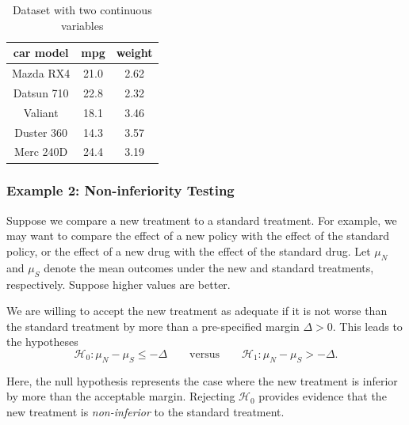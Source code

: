 \documentclass[11pt]{article}
\theoremstyle{plain}
\theoremstyle{definition}
\newcommand{\Hy}{\mathcal{H}}
\begin{document}

\begin{table}[h]
\centering
\caption{Dataset with two continuous variables}
\label{tab:cars}
\begin{tabular}{ccc}
\hline
car model & mpg & weight \\
\hline
Mazda RX4 &21.0  & 2.62 \\
Datsun 710 &22.8 & 2.32 \\
Valiant      & 18.1   & 3.46 \\
Duster 360 &14.3 & 3.57 \\
Merc 240D  &24.4 & 3.19 \\
\hline
\end{tabular}
\end{table}






\subsubsection{Example 2: Non-inferiority Testing} \label{secnoninf}

Suppose we compare a new treatment to a standard treatment. For example, we may want to compare the effect of a new policy with the effect of the standard policy, or the effect of a new drug with the effect of the standard drug. Let $\mu_N$ and $\mu_S$ denote the mean outcomes under the new and standard treatments, respectively. Suppose higher values are  better.

We are willing to accept the new treatment as adequate if it is not worse than the standard treatment by more than a pre-specified margin $\Delta > 0$. This leads to the hypotheses
\[
\Hy_0: \mu_N - \mu_S \le -\Delta
\qquad \text{versus} \qquad
\Hy_1: \mu_N - \mu_S > -\Delta.
\]

Here, the null hypothesis represents the case where the new treatment is inferior by more than the acceptable margin. Rejecting $\Hy_0$ provides evidence that the new treatment is \emph{non-inferior} to the standard treatment.



\end{document}
